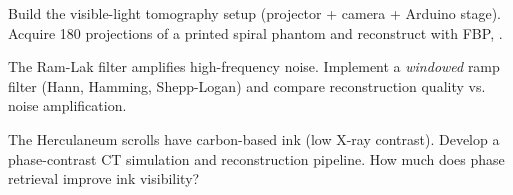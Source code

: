 \begin{exercise}
Build the visible-light tomography setup (projector + camera + Arduino stage). Acquire 180 projections of a printed spiral phantom and reconstruct with FBP, \cite{foschiatti2025tomography}.
\end{exercise}

\begin{exercise}
The Ram-Lak filter amplifies high-frequency noise. Implement a \emph{windowed} ramp filter (Hann, Hamming, Shepp-Logan) and compare reconstruction quality vs. noise amplification.
\end{exercise}

\begin{exercise}[Research]
The Herculaneum scrolls have carbon-based ink (low X-ray contrast). Develop a phase-contrast CT simulation and reconstruction pipeline. How much does phase retrieval improve ink visibility? \cite{foschiatti2025tomography}
\end{exercise}